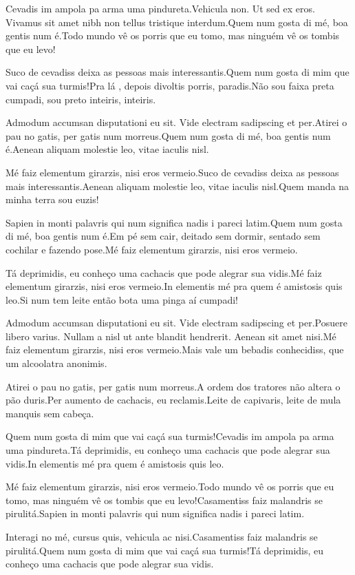 \documentclass[twoside, a4paper, 12pt]{article}
\begin{document}
  Cevadis im ampola pa arma uma pindureta.Vehicula non. Ut sed ex eros. Vivamus sit amet nibh non tellus tristique interdum.Quem num gosta di mé, boa gentis num é.Todo mundo vê os porris que eu tomo, mas ninguém vê os tombis que eu levo!
  
  Suco de cevadiss deixa as pessoas mais interessantis.Quem num gosta di mim que vai caçá sua turmis!Pra lá , depois divoltis porris, paradis.Não sou faixa preta cumpadi, sou preto inteiris, inteiris.
  
  Admodum accumsan disputationi eu sit. Vide electram sadipscing et per.Atirei o pau no gatis, per gatis num morreus.Quem num gosta di mé, boa gentis num é.Aenean aliquam molestie leo, vitae iaculis nisl.
  
  Mé faiz elementum girarzis, nisi eros vermeio.Suco de cevadiss deixa as pessoas mais interessantis.Aenean aliquam molestie leo, vitae iaculis nisl.Quem manda na minha terra sou euzis!
  
  Sapien in monti palavris qui num significa nadis i pareci latim.Quem num gosta di mé, boa gentis num é.Em pé sem cair, deitado sem dormir, sentado sem cochilar e fazendo pose.Mé faiz elementum girarzis, nisi eros vermeio.
  
  Tá deprimidis, eu conheço uma cachacis que pode alegrar sua vidis.Mé faiz elementum girarzis, nisi eros vermeio.In elementis mé pra quem é amistosis quis leo.Si num tem leite então bota uma pinga aí cumpadi!
  
  Admodum accumsan disputationi eu sit. Vide electram sadipscing et per.Posuere libero varius. Nullam a nisl ut ante blandit hendrerit. Aenean sit amet nisi.Mé faiz elementum girarzis, nisi eros vermeio.Mais vale um bebadis conhecidiss, que um alcoolatra anonimis.
  
  Atirei o pau no gatis, per gatis num morreus.A ordem dos tratores não altera o pão duris.Per aumento de cachacis, eu reclamis.Leite de capivaris, leite de mula manquis sem cabeça.
  
  Quem num gosta di mim que vai caçá sua turmis!Cevadis im ampola pa arma uma pindureta.Tá deprimidis, eu conheço uma cachacis que pode alegrar sua vidis.In elementis mé pra quem é amistosis quis leo.
  
  Mé faiz elementum girarzis, nisi eros vermeio.Todo mundo vê os porris que eu tomo, mas ninguém vê os tombis que eu levo!Casamentiss faiz malandris se pirulitá.Sapien in monti palavris qui num significa nadis i pareci latim.
  
  Interagi no mé, cursus quis, vehicula ac nisi.Casamentiss faiz malandris se pirulitá.Quem num gosta di mim que vai caçá sua turmis!Tá deprimidis, eu conheço uma cachacis que pode alegrar sua vidis.
  
\end{document}
